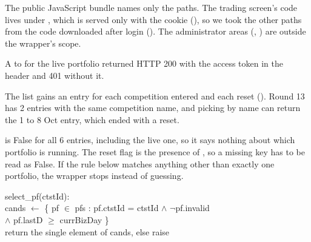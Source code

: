 \seclabel
{}

 The public JavaScript bundle names only the  paths. The trading screen's code lives under , which is served only with the  cookie (), so we took the other paths from the code downloaded after login (). The administrator areas (, ) are outside the wrapper's scope.



 A  to  for the live portfolio returned HTTP 200 with the access token in the header and 401 without it.

 The  list gains an entry for each competition entered and each reset (). Round 13 has 2 entries with the same competition name, and picking by name can return the 1 to 8 Oct entry, which ended with a reset.



  is False for all 6 entries, including the live one, so it says nothing about which portfolio is running. The reset flag is the presence of , so a missing key has to be read as False. If the rule below matches anything other than exactly one portfolio, the wrapper stops instead of guessing.

\par\noindent\begin{minipage}{\linewidth}\fontsize{8.5}{11}\selectfont\ttfamily
\hspace*{4mm}select\_pf(ctstId):\\
\hspace*{8mm}cands $\leftarrow$ \{ pf $\in$ pfs : pf.ctstId = ctstId $\wedge$ $\neg$pf.invalid\\
\hspace*{38mm}$\wedge$ pf.lastD $\geq$ currBizDay \}\\
\hspace*{8mm}return the single element of cands, else raise\end{minipage}\par\vspace{4pt}

